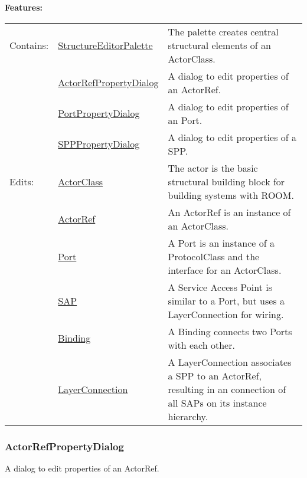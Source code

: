 		
	\begingroup
	\textbf{Features:}
	\renewcommand{\arraystretch}{1.8} %
	\begin{longtable}{l|l p{}}
		\hline
	Contains: & \tabitem \hyperlink{ref:StructureEditorPalette}{StructureEditorPalette}  & The palette creates central structural elements of an ActorClass.\\
	& \tabitem \hyperlink{ref:ActorRefPropertyDialog}{ActorRefPropertyDialog}  & A dialog to edit properties of an ActorRef. \\
	& \tabitem \hyperlink{ref:PortPropertyDialog}{PortPropertyDialog}  & A dialog to edit properties of an Port. \\
	& \tabitem \hyperlink{ref:SPPPropertyDialog}{SPPPropertyDialog}  & A dialog to edit properties of a SPP. \\
	\hline
	Edits: & \tabitem \hyperlink{ref:ActorClass}{ActorClass}  & The actor is the basic structural building block for building systems with ROOM.\\
	& \tabitem \hyperlink{ref:ActorRef}{ActorRef}  & An ActorRef is an instance of an ActorClass. \\
	& \tabitem \hyperlink{ref:Port}{Port}  & A Port is an instance of a ProtocolClass and the interface for an ActorClass. \\
	& \tabitem \hyperlink{ref:SAP}{SAP}  & A Service Access Point is similar to a Port, but uses a LayerConnection for wiring. \\
	& \tabitem \hyperlink{ref:Binding}{Binding}  & A Binding connects two Ports with each other. \\
	& \tabitem \hyperlink{ref:LayerConnection}{LayerConnection}  & A LayerConnection associates a SPP to an ActorRef, resulting in an connection of all SAPs on its instance hierarchy. \\
	\hline
	\end{longtable}
	\endgroup
		
		
	
	\vspace{\baselineskip}
	\vspace{\baselineskip}
	\vspace{\baselineskip}
	
\subsubsection{ActorRefPropertyDialog}
	\hypertarget{ref:ActorRefPropertyDialog}{}
	A dialog to edit properties of an ActorRef.
		
